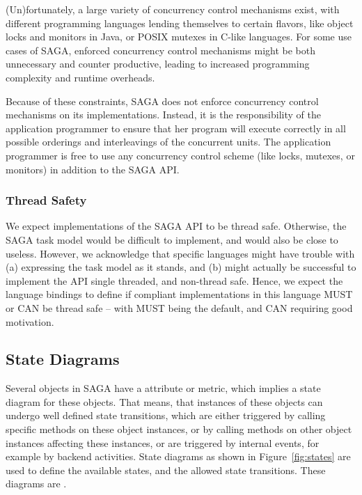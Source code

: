    (Un)fortunately, a large variety of concurrency control
   mechanisms exist, with different programming languages
   lending themselves to certain flavors, like object locks and
   monitors in Java, or POSIX mutexes in C-like languages. For
   some use cases of SAGA, enforced concurrency control
   mechanisms might be both unnecessary and counter productive,
   leading to increased programming complexity and runtime
   overheads.
   
   Because of these constraints, SAGA does not enforce
   concurrency control mechanisms on its implementations. Instead, it is
   the responsibility of the application programmer to ensure
   that her program will execute correctly in all possible
   orderings and interleavings of the concurrent units. The
   application programmer is free to use any concurrency control
   scheme (like locks, mutexes, or monitors) in addition to the
   SAGA API.

  \subsubsection{Thread Safety}
  \label{ssec:threads}

   We expect implementations of the SAGA API to be thread safe.
   Otherwise, the SAGA task model would be difficult to
   implement, and would also be close to useless.  However, we
   acknowledge that specific languages might have trouble with
   (a) expressing the task model as it stands, and (b) might
   actually be successful to implement the API single threaded,
   and non-thread safe.  Hence, we expect the language bindings
   to define if compliant implementations in this language MUST
   or CAN be thread safe -- with MUST being the default, and CAN
   requiring good motivation.


  \subsection{State Diagrams}

    Several objects in SAGA have a  attribute or
    metric, which implies a state diagram for these objects.
    That means, that instances of these objects can undergo well
    defined state transitions, which are either triggered by
    calling specific methods on these object instances, or by
    calling methods on other object instances affecting these
    instances, or are triggered by internal events, for example
    by backend activities.  State diagrams as shown in
    Figure~\ref{fig:states} are used to define the available
    states, and the allowed state transitions.  These
    diagrams are .

